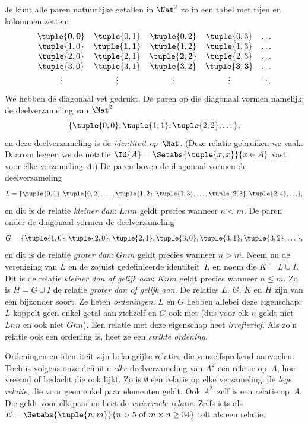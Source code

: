 \documentclass[openany]{memoir}
\begin{document}
\begin{ex}
Je kunt alle paren natuurlijke getallen in $\Nat^{2}$ zo in een tabel
met rijen en kolommen zetten:
\[
  \begin{array}{ccccc}
  \mathbf{\tuple{ 0,0 }} & \tuple{ 0,1 } &
    \tuple{ 0,2 } & \tuple{ 0,3 } & \ldots\\
  \tuple{ 1,0 } & \mathbf{\tuple{ 1,1 }} &
    \tuple{ 1,2 } & \tuple{ 1,3 } & \ldots\\
  \tuple{ 2,0 } & \tuple{ 2,1 } &
    \mathbf{\tuple{ 2,2 }} & \tuple{ 2,3 } & \ldots\\
  \tuple{ 3,0 } & \tuple{ 3,1 } & \tuple{ 3,2 } &
    \mathbf{\tuple{ 3,3 }} & \ldots\\
  \vdots & \vdots & \vdots & \vdots & \mathbf{\ddots}
  \end{array}
\]
We hebben de diagonaal vet gedrukt. De paren op die diagonaal vormen
namelijk de deelverzameling van $\Nat^2$
\[
  \{\tuple{0,0 }, \tuple{ 1,1 }, \tuple{ 2,2 }, \dots\},
  \]
en deze deelverzameling is de \emph{identiteit op}~$\Nat$. (Deze relatie
gebruiken we vaak. Daarom leggen we de notatie
$\Id{A}=\Setabs{\tuple{ x,x }}{x \in A}$ vast voor elke verzameling
$A$.) De paren boven de
diagonaal vormen de deelverzameling
\[
  L = \{\tuple{ 0,1 },\tuple{ 0,2 },\ldots,\tuple{ 1,2 },
  \tuple{ 1,3 }, \dots, \tuple{ 2,3 }, \tuple{ 2,4 },\ldots\},
\]
en dit is de relatie \emph{kleiner dan}: $Lnm$ geldt precies wanneer
$n<m$. De paren onder de diagonaal vormen de deelverzameling
\[
  G=\{ \tuple{ 1,0 },\tuple{ 2,0 },\tuple{
    2,1 }, \tuple{ 3,0 },\tuple{ 3,1 },\tuple{ 3,2 }, \dots\},
\]
en dit is de relatie \emph{groter dan}: $Gnm$ geldt precies wanneer
$n>m$. Neem nu de vereniging van $L$ en de zojuist gedefinieerde
identiteit~$I$, en noem die $K=L\cup I$.
Dit is de relatie \emph{kleiner dan of gelijk aan}: $Knm$ geldt precies
wanneer $n \le m$. Zo is $H=G \cup I$ de relatie \emph{groter dan of
gelijk aan.} De relaties $L$, $G$, $K$ en $H$ zijn van een bijzonder
soort. Ze heten \emph{ordeningen}. $L$ en $G$ hebben allebei deze
eigenschap: $L$ koppelt geen enkel getal aan zichzelf en $G$ ook niet
(dus voor elk $n$ geldt niet $Lnn$ en
ook niet $Gnn$). Een relatie met deze eigenschap heet
\emph{irreflexief}. Als zo'n relatie ook een ordening is, heet ze een
\emph{strikte ordening.}
\end{ex}

\begin{explain}
Ordeningen en identiteit zijn belangrijke relaties die vanzelfsprekend
aanvoelen. Toch is volgens onze definitie \emph{elke} deelverzameling
van $A^{2}$ een relatie op~$A$, hoe vreemd of bedacht die ook lijkt. Zo
is $\emptyset$ een relatie op elke verzameling: de \emph{lege relatie},
die voor geen enkel paar elementen geldt. Ook $A^{2}$~zelf is een
relatie op~$A$. Die geldt voor elk paar en heet de \emph{universele
relatie}. Zelfs iets als
$E=\Setabs{\tuple{n, m}}{n>5 \text{ of } m \times n \ge 34}$ telt als
een relatie.
\end{explain}
  
\end{document}
